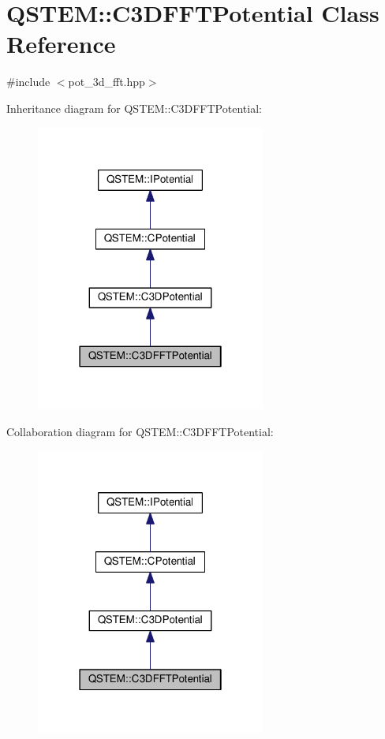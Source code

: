 \hypertarget{class_q_s_t_e_m_1_1_c3_d_f_f_t_potential}{\section{Q\-S\-T\-E\-M\-:\-:C3\-D\-F\-F\-T\-Potential Class Reference}
\label{class_q_s_t_e_m_1_1_c3_d_f_f_t_potential}
}


{\ttfamily \#include $<$pot\-\_\-3d\-\_\-fft.\-hpp$>$}



Inheritance diagram for Q\-S\-T\-E\-M\-:\-:C3\-D\-F\-F\-T\-Potential\-:
\nopagebreak
\begin{figure}[H]
\begin{center}
\leavevmode
\includegraphics[width=214pt]{class_q_s_t_e_m_1_1_c3_d_f_f_t_potential__inherit__graph}
\end{center}
\end{figure}


Collaboration diagram for Q\-S\-T\-E\-M\-:\-:C3\-D\-F\-F\-T\-Potential\-:
\nopagebreak
\begin{figure}[H]
\begin{center}
\leavevmode
\includegraphics[width=214pt]{class_q_s_t_e_m_1_1_c3_d_f_f_t_potential__coll__graph}
\end{center}
\end{figure}
